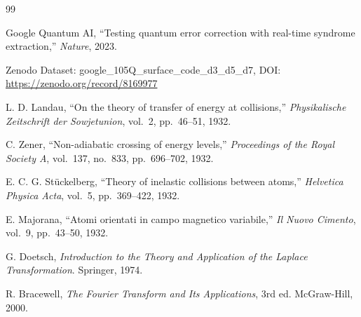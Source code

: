 \documentclass[11pt]{article}
\begin{document}
\begin{thebibliography}{99}

Google Quantum AI, ``Testing quantum error correction with real-time syndrome extraction,'' \emph{Nature}, 2023.

Zenodo Dataset: google\_105Q\_surface\_code\_d3\_d5\_d7, DOI: \url{https://zenodo.org/record/8169977}

L. D. Landau, ``On the theory of transfer of energy at collisions,'' \emph{Physikalische Zeitschrift der Sowjetunion}, vol.~2, pp.~46--51, 1932.

C. Zener, ``Non-adiabatic crossing of energy levels,'' \emph{Proceedings of the Royal Society A}, vol.~137, no.~833, pp.~696--702, 1932.

E. C. G. St\"uckelberg, ``Theory of inelastic collisions between atoms,'' \emph{Helvetica Physica Acta}, vol.~5, pp.~369--422, 1932.

E. Majorana, ``Atomi orientati in campo magnetico variabile,'' \emph{Il Nuovo Cimento}, vol.~9, pp.~43--50, 1932.

G. Doetsch, \emph{Introduction to the Theory and Application of the Laplace Transformation}. Springer, 1974.

R. Bracewell, \emph{The Fourier Transform and Its Applications}, 3rd ed. McGraw-Hill, 2000.

\end{thebibliography}
\end{document}
